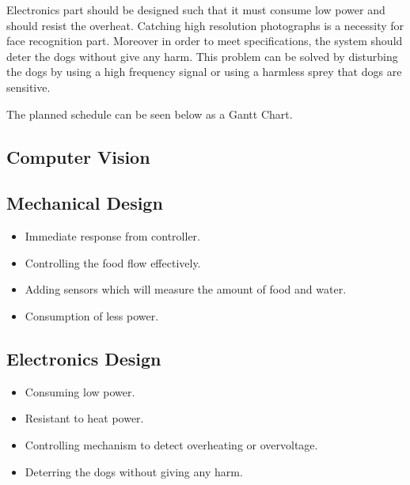 Electronics part should be designed such that it must consume low power and should resist the overheat. Catching high resolution photographs is a necessity for face recognition part. Moreover in order to meet specifications, the system should deter the dogs without give any harm. This problem can be solved by disturbing the dogs by using a high frequency signal\cite{cite:Dogrepellingdetterent} or using a harmless sprey\cite{cite:Dogrepellingsprey}  that dogs are sensitive.

The planned schedule can be seen below as a Gantt Chart.
 
\subsection{Computer Vision} \label{sec:sol_proc} %
 
\subsection{Mechanical Design} \label{sec:sol_proc} %
\begin{itemize}
\item Immediate response from controller. 

\item Controlling the food flow effectively.

\item Adding sensors which will measure the amount of food and water.

\item Consumption of less power. 
\end{itemize}

\subsection{Electronics Design} \label{sec:sol_proc} %

\begin{itemize}
\item Consuming low power.

\item Resistant to heat power. 

\item Controlling mechanism to detect overheating or overvoltage. 

\item Deterring the dogs without giving any harm.

\end{itemize}
